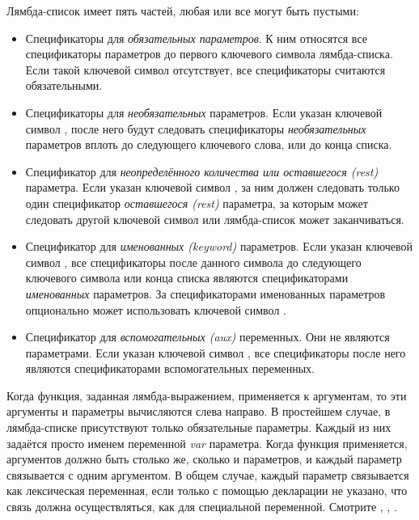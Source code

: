 Лямбда-список имеет пять частей, любая или все могут быть пустыми:

\begin{itemize}

\item
Спецификаторы для \emph{обязательных параметров}. К ним относятся все
спецификаторы параметров до первого ключевого символа лямбда-списка. Если такой
ключевой символ отсутствует, все спецификаторы считаются обязательными.

\item
Спецификаторы для \emph{необязательных} параметров.
Если указан ключевой символ , после него будут следовать спецификаторы
\emph{необязательных} параметров вплоть до следующего ключевого слова, или до
конца списка.

\item
Спецификатор для \emph{неопределённого количества или оставшегося (rest)}
параметра. Если указан ключевой символ , за ним должен следовать
только один спецификатор \emph{оставшегося (rest)} параметра, за которым может
следовать другой ключевой символ или лямбда-список может заканчиваться.

\item
Спецификатор для \emph{именованных (keyword)} параметров. Если указан ключевой
символ , все спецификаторы после данного символа до
следующего ключевого символа или конца списка являются спецификаторами
\emph{именованных} параметров. За спецификаторами именованных параметров
опционально может использовать ключевой символ
.

\item
Спецификатор для \emph{вспомогательных (aux)} переменных. Они не являются
параметрами. Если указан ключевой символ , все
спецификаторы после него являются спецификаторами вспомогательных переменных.
\end{itemize}

Когда функция, заданная лямбда-выражением, применяется к аргументам, то эти
аргументы и параметры вычисляются слева направо.
В простейшем случае, в лямбда-списке присутствуют только обязательные
параметры. Каждый из них задаётся просто именем переменной \emph{var}
параметра.
Когда функция применяется, аргументов должно быть столько же, сколько и
параметров, и каждый параметр связывается с одним аргументом. В общем случае,
каждый параметр связывается как лексическая переменная, если только с помощью
декларации не указано, что связь должна осуществляться, как для специальной
переменной. Смотрите , , .

